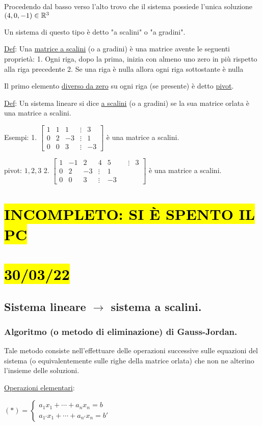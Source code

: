 \documentclass{article}
\begin{document}
Procedendo dal basso verso l'alto trovo che il sistema possiede l'unica soluzione $(4,0,-1)\in\mathbb{R}^3$

Un sistema di questo tipo è detto "a scalini" o "a gradini".

\ul{Def}: Una \ul{matrice a scalini} (o a gradini) è una matrice avente le seguenti proprietà:
1. Ogni riga, dopo la prima, inizia con almeno uno zero in più rispetto alla riga precedente
2. Se una riga è nulla allora ogni riga sottostante è nulla

Il primo elemento \ul{diverso da zero} su ogni riga (se presente) è detto \ul{pivot}.

\ul{Def}: Un sistema lineare si dice \ul{a scalini} (o a gradini) se la sua matrice orlata è una matrice a scalini.

Esempi:
1. $\begin{bmatrix}
1&1&1&\vdots&3\\
0&2&-3&\vdots&1\\
0&0&3&\vdots&-3
\end{bmatrix}$ è una matrice a scalini.

    pivot: $1,2,3$
2. $\begin{bmatrix}
1&-1&2&4&5&&\vdots&3\\
0&2&-3&\vdots&1\\
0&0&3&\vdots&-3
\end{bmatrix}$ è una matrice a scalini.
\section*{\hl{INCOMPLETO: SI È SPENTO IL PC}}
\section{\hl{30/03/22}}
\subsection*{Sistema lineare $\longrightarrow$ sistema a scalini.}
\subsubsection*{Algoritmo (o metodo di eliminazione) di Gauss-Jordan.}
Tale metodo consiste nell'effettuare delle operazioni successive sulle equazioni del sistema (o equivalentemente sulle righe della matrice orlata) che non ne alterino l'insieme delle soluzioni.

\ul{Operazioni elementari}:

$(*)=\begin{cases}
  a_1x_1+\cdots+a_nx_n=b\\
  a_{1'}x_1+\cdots+a_{n'}x_n=b'
\end{cases}$
\end{document}
